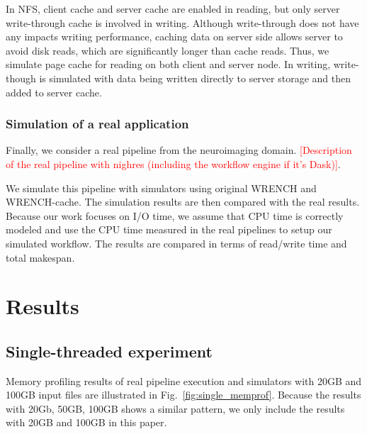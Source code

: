 \documentclass[conference]{IEEEtran}
\begin{document}
            In NFS, client cache and server cache are enabled in reading, but only 
            server write-through cache is involved in writing. 
            Although write-through does not have any impacts writing performance, 
            caching data on server side allows server to avoid disk reads, which are 
            significantly longer than cache reads.
            Thus, we simulate page cache for reading on both client and server node.
            In writing, write-though is simulated with data being written directly to 
            server storage and then added to server cache. 
            
            \subsubsection{Simulation of a real application}

            Finally, we consider a real pipeline from the neuroimaging domain.             
            \textcolor{red}{[Description of the real pipeline with nighres 
            (including the workflow engine if it's Dask)]}.              
            
            We simulate this pipeline with simulators using original WRENCH and 
            WRENCH-cache. 
            The simulation results are then compared with the real results. 
            Because our work focuses on I/O time, we assume that CPU time is 
            correctly modeled and use the CPU time measured in the real pipelines 
            to setup our simulated workflow. The results are compared in terms of 
            read/write time and total makespan.

    \section{Results}
    \label{results}

        \subsection{Single-threaded experiment}

            Memory profiling results of real pipeline execution and simulators 
			with 20GB and 100GB input files are illustrated in Fig.~\ref{fig:single_memprof}.
			Because the results with 20Gb, 50GB, 100GB shows a similar pattern,
			we only include the results with 20GB and 100GB in this paper.
\end{document}
